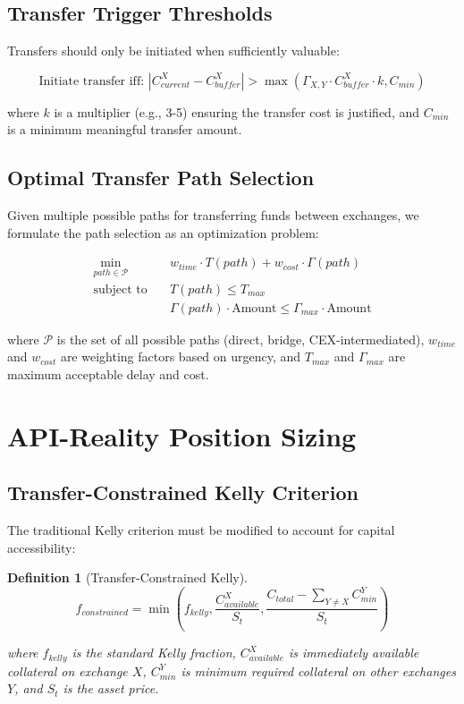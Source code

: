 \documentclass{article}
\newtheorem{definition}{Definition}
\begin{document}
\subsection{Transfer Trigger Thresholds}

Transfers should only be initiated when sufficiently valuable:

\begin{equation}
\text{Initiate transfer iff: } |C_{current}^X - C_{buffer}^X| > \max(\Gamma_{X,Y} \cdot C_{buffer}^X \cdot k, C_{min})
\end{equation}

where $k$ is a multiplier (e.g., 3-5) ensuring the transfer cost is justified, and $C_{min}$ is a minimum meaningful transfer amount.

\subsection{Optimal Transfer Path Selection}

Given multiple possible paths for transferring funds between exchanges, we formulate the path selection as an optimization problem:

\begin{align}
\min_{path \in \mathcal{P}} \quad & w_{time} \cdot T(path) + w_{cost} \cdot \Gamma(path) \\
\text{subject to} \quad & T(path) \leq T_{max} \\
& \Gamma(path) \cdot \text{Amount} \leq \Gamma_{max} \cdot \text{Amount}
\end{align}

where $\mathcal{P}$ is the set of all possible paths (direct, bridge, CEX-intermediated), $w_{time}$ and $w_{cost}$ are weighting factors based on urgency, and $T_{max}$ and $\Gamma_{max}$ are maximum acceptable delay and cost.

\section{API-Reality Position Sizing}

\subsection{Transfer-Constrained Kelly Criterion}

The traditional Kelly criterion must be modified to account for capital accessibility:

\begin{definition}[Transfer-Constrained Kelly]
\begin{equation}
f_{constrained} = \min(f_{kelly}, \frac{C_{available}^X}{S_t}, \frac{C_{total} - \sum_{Y \neq X} C_{min}^Y}{S_t})
\end{equation}

where $f_{kelly}$ is the standard Kelly fraction, $C_{available}^X$ is immediately available collateral on exchange $X$, $C_{min}^Y$ is minimum required collateral on other exchanges $Y$, and $S_t$ is the asset price.
\end{definition}
\end{document}
